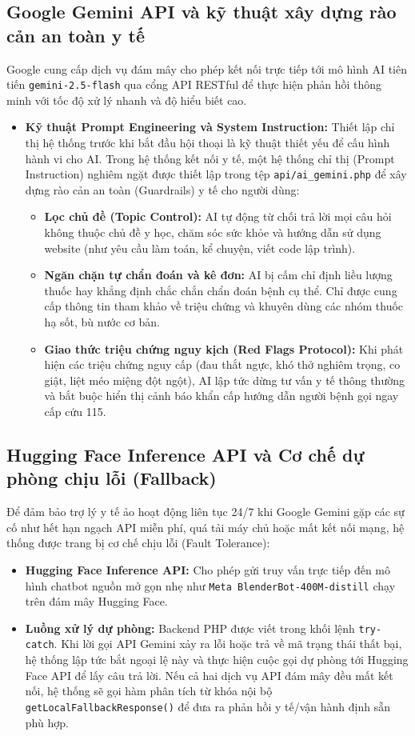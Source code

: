 \documentclass[a4paper,12pt]{report}
\begin{document}
\subsection{Google Gemini API và kỹ thuật xây dựng rào cản an toàn y tế}
Google cung cấp dịch vụ đám mây cho phép kết nối trực tiếp tới mô hình AI tiên tiến \texttt{gemini-2.5-flash} qua cổng API RESTful để thực hiện phản hồi thông minh với tốc độ xử lý nhanh và độ hiểu biết cao.
\begin{itemize}
    \item \textbf{Kỹ thuật Prompt Engineering và System Instruction:} Thiết lập chỉ thị hệ thống trước khi bắt đầu hội thoại là kỹ thuật thiết yếu để cấu hình hành vi cho AI. Trong hệ thống kết nối y tế, một hệ thống chỉ thị (Prompt Instruction) nghiêm ngặt được thiết lập trong tệp \texttt{api/ai_gemini.php} để xây dựng rào cản an toàn (Guardrails) y tế cho người dùng:
    \begin{itemize}
        \item \textbf{Lọc chủ đề (Topic Control):} AI tự động từ chối trả lời mọi câu hỏi không thuộc chủ đề y học, chăm sóc sức khỏe và hướng dẫn sử dụng website (như yêu cầu làm toán, kể chuyện, viết code lập trình).
        \item \textbf{Ngăn chặn tự chẩn đoán và kê đơn:} AI bị cấm chỉ định liều lượng thuốc hay khẳng định chắc chắn chẩn đoán bệnh cụ thể. Chỉ được cung cấp thông tin tham khảo về triệu chứng và khuyên dùng các nhóm thuốc hạ sốt, bù nước cơ bản.
        \item \textbf{Giao thức triệu chứng nguy kịch (Red Flags Protocol):} Khi phát hiện các triệu chứng nguy cấp (đau thắt ngực, khó thở nghiêm trọng, co giật, liệt méo miệng đột ngột), AI lập tức dừng tư vấn y tế thông thường và bắt buộc hiển thị cảnh báo khẩn cấp hướng dẫn người bệnh gọi ngay cấp cứu 115.
    \end{itemize}
\end{itemize}

\subsection{Hugging Face Inference API và Cơ chế dự phòng chịu lỗi (Fallback)}
Để đảm bảo trợ lý y tế ảo hoạt động liên tục 24/7 khi Google Gemini gặp các sự cố như hết hạn ngạch API miễn phí, quá tải máy chủ hoặc mất kết nối mạng, hệ thống được trang bị cơ chế chịu lỗi (Fault Tolerance):
\begin{itemize}
    \item \textbf{Hugging Face Inference API:} Cho phép gửi truy vấn trực tiếp đến mô hình chatbot nguồn mở gọn nhẹ như \texttt{Meta BlenderBot-400M-distill} chạy trên đám mây Hugging Face.
    \item \textbf{Luồng xử lý dự phòng:} Backend PHP được viết trong khối lệnh \texttt{try-catch}. Khi lời gọi API Gemini xảy ra lỗi hoặc trả về mã trạng thái thất bại, hệ thống lập tức bắt ngoại lệ này và thực hiện cuộc gọi dự phòng tới Hugging Face API để lấy câu trả lời. Nếu cả hai dịch vụ API đám mây đều mất kết nối, hệ thống sẽ gọi hàm phân tích từ khóa nội bộ \texttt{getLocalFallbackResponse()} để đưa ra phản hồi y tế/vận hành định sẵn phù hợp.
\end{itemize}
\end{document}
